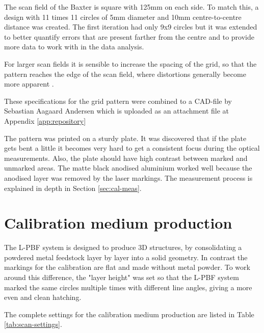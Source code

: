 The scan field of the Baxter is square with 125mm on each side. To match this, a design with 11 times 11 circles of 5mm diameter and 10mm centre-to-centre distance was created. The first iteration had only 9x9 circles but it was extended to better quantify errors that are present farther from the centre and to provide more data to work with in the data analysis. 

For larger scan fields it is sensible to increase the spacing of the grid, so that the pattern reaches the edge of the scan field, where distortions generally become more apparent \cite[Figure 2.35]{sebastian-phd}.

These specifications for the grid pattern were combined to a CAD-file by Sebastian Aagaard Andersen which is uploaded as an attachment file at Appendix \ref{app:repository}

The pattern was printed on a sturdy plate. It was discovered that if the plate gets bent a little it becomes very hard to get a consistent focus during the optical measurements. Also, the plate should have high contrast between marked and unmarked areas. The matte black anodised aluminium worked well because the anodised layer was removed by the laser markings. The measurement process is explained in depth in Section \ref{sec:cal-meas}.

\section{Calibration medium production} \label{sec:cal-medium-prod}

The L-PBF system is designed to produce 3D structures, by consolidating a powdered metal feedstock layer by layer into a solid geometry. In contrast the markings for the calibration are flat and made without metal powder. To work around this difference, the "layer height" was set so that the L-PBF system marked the same circles multiple times with different line angles, giving a more even and clean hatching.

The complete settings for the calibration medium production are listed in Table \ref{tab:scan-settings}.

